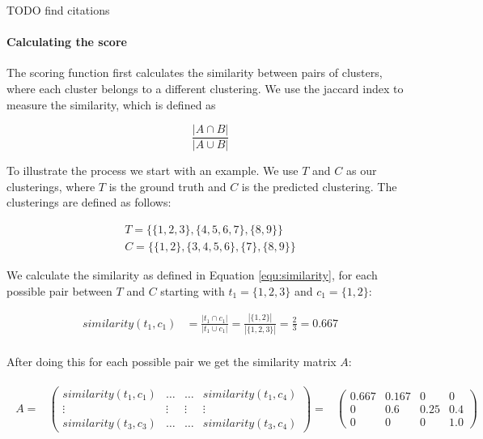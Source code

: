 TODO find citations

\paragraph{Calculating the score}

The scoring function first calculates the similarity between pairs of clusters, where each cluster belongs to a different clustering. We use the jaccard index to measure the similarity, which is defined as

\begin{equation}
    \label{equ:similarity}
    \frac{|A \cap B|}{|A \cup B|}
\end{equation}

To illustrate the process we start with an example. We use $T$ and $C$ as our clusterings, where $T$ is the ground truth and $C$ is the predicted clustering. The clusterings are defined as follows:

\begin{gather*}
    T = \{\{1,2,3\},\{4,5,6,7\},\{8,9\}\} \\
    C = \{\{1,2\},\{3,4,5,6\},\{7\},\{8,9\}\}
\end{gather*}

We calculate the similarity as defined in Equation \ref{equ:similarity}, for each possible pair between $T$ and $C$ starting with $t_1= \{1,2,3\}$ and $c_1 = \{1,2\}$:

\begin{align*}
    similarity(t_1,c_1) &=\frac{|t_1 \cap c_1|}{|t_1 \cup c_1|}
    = \frac{|\{1,2\}|}{|\{1,2,3\}|}
    = \frac{2}{3} = 0.667 \\
\end{align*}

After doing this for each possible pair we get the similarity matrix $A$:

\begin{gather*}
\begin{array}{rcl}
    A = & \left(\begin{array}{cccc}
        similarity(t_1,c_1) & \hdots & \hdots & similarity(t_1,c_4)\\
        \vdots & \vdots & \vdots & \vdots\\
        similarity(t_3,c_3) & \hdots & \hdots & similarity(t_3,c_4) \end{array}\right)
        = & \left(\begin{array}{cccc}
            0.667 & 0.167 & 0 & 0 \\
            0 & 0.6 & 0.25 & 0.4 \\
            0 &  0 & 0 & 1.0 \end{array}\right)
\end{array}
\end{gather*}

